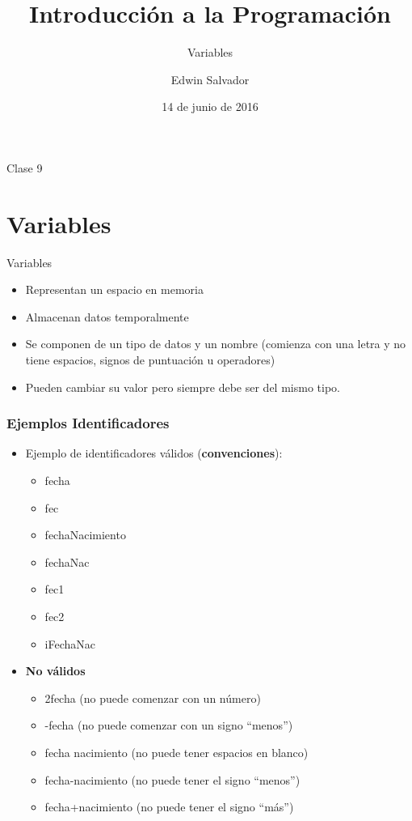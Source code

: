 \documentclass[handout]{beamer}
\title{Introducción a la Programación}
\subtitle{Variables}
\author{Edwin Salvador}
\date{14 de junio de 2016}
\begin{document}
  \begin{frame}
    \titlepage
    \centerline{Clase 9}
  \end{frame}
  

\section{Variables} %
\label{sec:variables}
\begin{frame}[t]{Variables}
    \begin{itemize}
      \item Representan un espacio en memoria
      \item Almacenan datos temporalmente
      \item Se componen de un tipo de datos y un nombre (comienza con una letra y no tiene espacios, signos de puntuación u operadores)
      \item Pueden cambiar su valor pero siempre debe ser del mismo tipo.
    \end{itemize}
\end{frame}

\begin{frame}[t]\frametitle{Ejemplos Identificadores}
    \begin{itemize}
      \item Ejemplo de identificadores válidos (\textbf{convenciones}):
        \begin{itemize}
          \item fecha
          \item fec
          \item fechaNacimiento
          \item fechaNac
          \item fec1
          \item fec2
          \item iFechaNac
        \end{itemize}
      \item \textbf{No válidos}
      \begin{itemize}
        \item 2fecha (no puede comenzar con un número)
        \item -fecha (no puede comenzar con un signo ``menos'')
        \item fecha nacimiento (no puede tener espacios en blanco)
        \item fecha-nacimiento (no puede tener el signo ``menos'')
        \item fecha+nacimiento (no puede tener el signo ``más'') 
      \end{itemize} 
    \end{itemize}
\end{frame}
\end{document}
